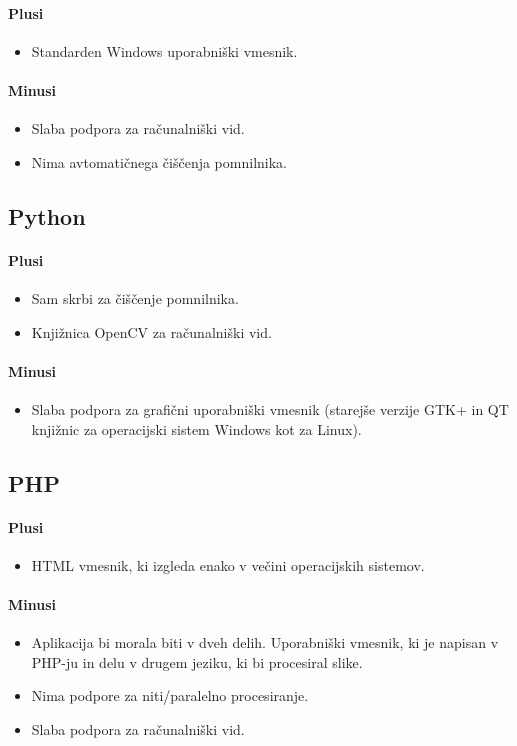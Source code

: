 \documentclass[oneside, a4paper, 12pt]{book}
\begin{document}
\paragraph{Plusi}
\begin{itemize}
\item Standarden Windows uporabniški vmesnik.
\end{itemize}
\paragraph{Minusi}
\begin{itemize}
\item Slaba podpora za računalniški vid.
\item Nima avtomatičnega čiščenja pomnilnika.
\end{itemize}

\subsection{Python}
\paragraph{Plusi}
\begin{itemize}
\item Sam skrbi za čiščenje pomnilnika.
\item Knjižnica OpenCV za računalniški vid.
\end{itemize}
\paragraph{Minusi}
\begin{itemize}
\item Slaba podpora za grafični uporabniški vmesnik (starejše verzije 
GTK+ in QT knjižnic za operacijski sistem Windows kot za Linux).
\end{itemize}

\subsection{PHP}
\paragraph{Plusi}
\begin{itemize}
\item HTML vmesnik, ki izgleda enako v večini operacijskih sistemov.
\end{itemize}
\paragraph{Minusi}
\begin{itemize}
\item Aplikacija bi morala biti v dveh delih. Uporabniški vmesnik, ki 
je napisan v PHP-ju in delu v drugem jeziku, ki bi procesiral slike.
\item Nima podpore za niti/paralelno procesiranje.
\item Slaba podpora za računalniški vid.
\end{itemize}
\end{document}
